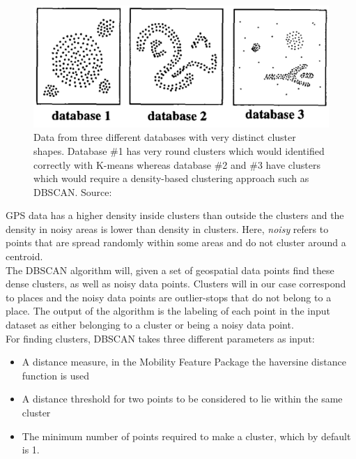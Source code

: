 \begin{figure}[h]
    \centering
    \includegraphics[width=\textwidth]{images/dbscan-clusters.png}
    \caption{Data from three different databases with very distinct cluster shapes. Database \#1 has very round clusters which would identified correctly with K-means whereas database \#2 and \#3 have clusters which would require a density-based clustering approach such as DBSCAN. Source: \cite{density-based-1996}}
    \label{fig:dbscan_shapes}
\end{figure}

GPS data has a higher density inside clusters than outside the clusters and the density in noisy areas is lower than density in clusters. Here, \textit{noisy} refers to points that are spread randomly within some areas and do not cluster around a centroid.\\

The DBSCAN algorithm will, given a set of geospatial data points find these dense clusters, as well as noisy data points. Clusters will in our case correspond to places and the noisy data points are outlier-stops that do not belong to a place. The output of the algorithm is the labeling of each point in the input dataset as either belonging to a cluster or being a noisy data point.\\

For finding clusters, DBSCAN takes three different parameters as input:

\begin{itemize}
    \item A distance measure, in the Mobility Feature Package the haversine distance function is used
    \item A distance threshold for two points to be considered to lie within the same cluster
    \item The minimum number of points required to make a cluster, which by default is 1. 
\end{itemize}


